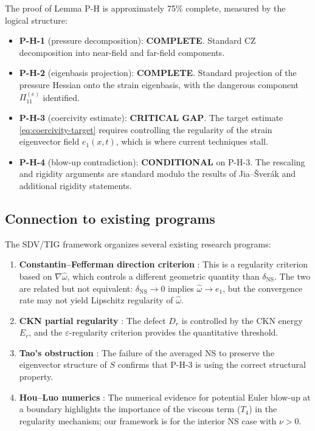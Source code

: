 \documentclass[11pt]{article}
\theoremstyle{definition}
\theoremstyle{remark}
\newcommand{\eps}{\varepsilon}
\begin{document}
The proof of Lemma P-H is approximately 75\% complete, measured by the logical
structure:
\begin{itemize}[nosep]
  \item \textbf{P-H-1} (pressure decomposition): \textbf{COMPLETE}.  Standard CZ
    decomposition into near-field and far-field components.
  \item \textbf{P-H-2} (eigenbasis projection): \textbf{COMPLETE}.  Standard
    projection of the pressure Hessian onto the strain eigenbasis, with the
    dangerous component $\Pi_{11}^{(e)}$ identified.
  \item \textbf{P-H-3} (coercivity estimate): \textbf{CRITICAL GAP}.  The target
    estimate \eqref{eq:coercivity-target} requires controlling the regularity of
    the strain eigenvector field $e_1(x,t)$, which is where current techniques stall.
  \item \textbf{P-H-4} (blow-up contradiction): \textbf{CONDITIONAL} on P-H-3.
    The rescaling and rigidity arguments are standard modulo the results of
    Jia--\v{S}ver\'ak \cite{JS} and additional rigidity statements.
\end{itemize}

\subsection{Connection to existing programs}

The SDV/TIG framework organizes several existing research programs:
\begin{enumerate}[nosep]
  \item \textbf{Constantin--Fefferman direction criterion} \cite{CF}: This is a
    regularity criterion based on $\nabla\hat\omega$, which controls a different
    geometric quantity than $\delta_{\mathrm{NS}}$.  The two are related but not
    equivalent: $\delta_{\mathrm{NS}} \to 0$ implies $\hat\omega \to e_1$, but the
    convergence rate may not yield Lipschitz regularity of $\hat\omega$.
  \item \textbf{CKN partial regularity} \cite{CKN}: The defect $D_r$ is controlled
    by the CKN energy $E_r$, and the $\eps$-regularity criterion provides the
    quantitative threshold.
  \item \textbf{Tao's obstruction} \cite{Tao}: The failure of the averaged NS
    to preserve the eigenvector structure of $S$ confirms that P-H-3 is using
    the correct structural property.
  \item \textbf{Hou--Luo numerics} \cite{HL}: The numerical evidence for potential
    Euler blow-up at a boundary highlights the importance of the viscous term ($T_4$)
    in the regularity mechanism; our framework is for the interior NS case with
    $\nu > 0$.
\end{enumerate}
\end{document}
